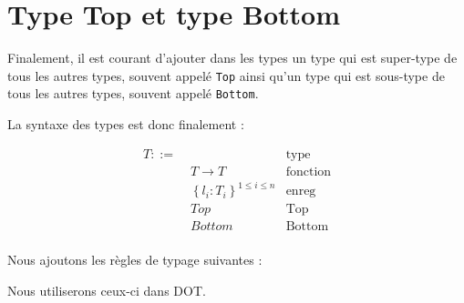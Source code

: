 \section{Type Top et type Bottom}

Finalement, il
est courant d'ajouter dans les types un type qui est super-type de tous les
autres types, souvent appelé \verb|Top| ainsi qu'un type qui est sous-type de
tous les autres types, souvent appelé \verb|Bottom|.

La syntaxe des types est donc finalement :

\begin{align*}
  T ::= & \, & \text{type} \\
        & \; T \rightarrow T & \text{fonction} \\
        & \; \left\{ l_{i} : T_{i} \right\}^{1 \leq i \leq n} & \text{enreg} \\
        & \; Top & \text{Top} \\
        & \; Bottom & \text{Bottom} \\
\end{align*}

Nous ajoutons les règles de typage suivantes :


Nous utiliserons ceux-ci dans DOT.
